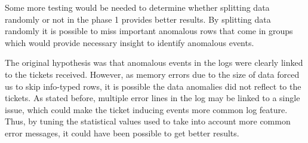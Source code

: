 Some more testing would be needed to determine
whether splitting data randomly or not in the phase 1
provides better results.
By splitting data randomly
it is possible to miss important anomalous rows that come in groups
which would provide necessary insight to identify anomalous events.



The original hypothesis was
that anomalous events in the logs
were clearly linked to the tickets received.
However,
as memory errors due to the size of data forced us to skip info-typed rows,
it is possible the data anomalies did not reflect to the tickets.
As stated before,
multiple error lines in the log may be linked to a single issue,
which could make the ticket inducing events
more common log feature.
Thus,
by tuning the statistical values used
to take into account more common error messages,
it could have been possible to get better results.



\clearpage
